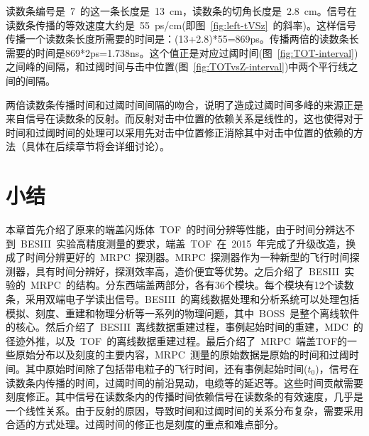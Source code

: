 读数条编号是~7~的这一条长度是~13~cm，读数条的切角长度是~2.8~cm。信号在读数条传播的等效速度大约是~55~ps/cm(即图~\ref{fig:left-tVSz}~的斜率)。这样信号传播一个读数条长度所需要的时间是：(13+2.8)*55=869ps。传播两倍的读数条长需要的时间是869*2ps=1.738ns。这个值正是对应过阈时间(图~\ref{fig:TOT-interval})之间峰的间隔，和过阈时间与击中位置(图~\ref{fig:TOTvsZ-interval})中两个平行线之间的间隔。

两倍读数条传播时间和过阈时间间隔的吻合，说明了造成过阈时间多峰的来源正是来自信号在读数条的反射。而反射对击中位置的依赖关系是线性的，这也使得对于时间和过阈时间的处理可以采用先对击中位置修正消除其中对击中位置的依赖的方法（具体在后续章节将会详细讨论）。

\section{小结}
本章首先介绍了原来的端盖闪烁体~TOF~的时间分辨等性能，由于时间分辨达不到~BESIII~实验高精度测量的要求，端盖~TOF~在~2015~年完成了升级改造，换成了时间分辨更好的~MRPC~探测器。MRPC~探测器作为一种新型的飞行时间探测器，具有时间分辨好，探测效率高，造价便宜等优势。之后介绍了~BESIII~实验的~MRPC~的结构。分东西端盖两部分，各有36个模块。每个模块有12个读数条，采用双端电子学读出信号。BESIII~的离线数据处理和分析系统可以处理包括模拟、刻度、重建和物理分析等一系列的物理问题，其中~BOSS~是整个离线软件的核心。然后介绍了~BESIII~离线数据重建过程，事例起始时间的重建，MDC~的径迹外推，以及~TOF~的离线数据重建过程。最后介绍了~MRPC~端盖TOF的一些原始分布以及刻度的主要内容，MRPC~测量的原始数据是原始的时间和过阈时间。其中原始时间除了包括带电粒子的飞行时间，还有事例起始时间($t_{0}$)，信号在读数条内传播的时间，过阈时间的前沿晃动，电缆等的延迟等。这些时间贡献需要刻度修正。其中信号在读数条内的传播时间依赖信号在读数条的有效速度，几乎是一个线性关系。由于反射的原因，导致时间和过阈时间的关系分布复杂，需要采用合适的方式处理。过阈时间的修正也是刻度的重点和难点部分。


